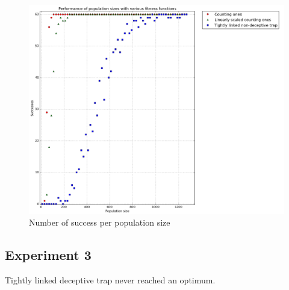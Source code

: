 \documentclass[12pt]{article}
\theoremstyle{definition}
\newcommand{\mytable}[3]{\
\begin{table}[H]
\caption*{Table Title}
\begin{tabular}{ll}
\hline
\textbf{Required population size} & #1            \\ \hline
\textbf{Function evaluations}     & #2            \\ \hline
\textbf{Corresponding CPU time}   & #3 seconds    \\ \hline
\end{tabular}
\end{table}
}
\begin{document}


\begin{figure}[H]
    \centering
    \includegraphics[width=1\linewidth]{images/exp2.png}
    \caption{Number of success per population size}
\label{fig:exp2}
\end{figure}


\subsection*{Experiment 3}
Tightly linked deceptive trap never reached an optimum.
\end{document}

